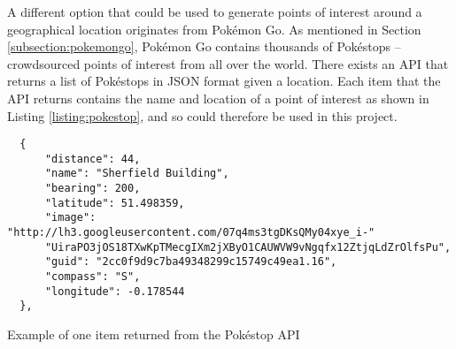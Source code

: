 A different option that could be used to generate points of interest around a geographical location originates from Pok\'{e}mon Go. As mentioned in Section \ref{subsection:pokemongo}, Pok\'{e}mon Go contains thousands of Pok\'{e}stops -- crowdsourced points of interest from all over the world. There exists an API \cite{Selwyn} that returns a list of Pok\'{e}stops in JSON format given a location. Each item that the API returns contains the name and location of a point of interest as shown in Listing \ref{listing:pokestop}, and so could therefore be used in this project.

\begin{listing}
  \centering
  \begin{lstlisting}
  {
      "distance": 44, 
      "name": "Sherfield Building", 
      "bearing": 200, 
      "latitude": 51.498359, 
      "image": "http://lh3.googleusercontent.com/07q4ms3tgDKsQMy04xye_i-"
      "UiraPO3jOS18TXwKpTMecgIXm2jXByO1CAUWVW9vNgqfx12ZtjqLdZrOlfsPu", 
      "guid": "2cc0f9d9c7ba49348299c15749c49ea1.16", 
      "compass": "S", 
      "longitude": -0.178544
  }, 
  \end{lstlisting}
  \caption{Example of one item returned from the Pok\'{e}stop API}
  \label{listing:pokestop}
\end{listing}





